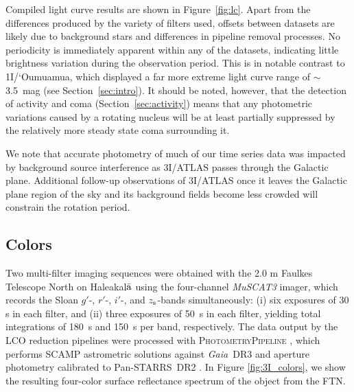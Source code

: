 \documentclass[twocolumn,longbib]{aastex7}
\begin{document}
\begin{CJK*}{UTF8}{gbsn}
Compiled light curve results are shown in Figure~\ref{fig:lc}.
Apart from the differences produced by the variety of filters used, offsets between datasets are likely due to background stars and differences in pipeline removal processes. No periodicity is immediately apparent within any of the datasets, indicating little brightness variation during the observation period.
This is in notable contrast to 1I/`Oumuamua, which displayed a far more extreme light curve range of $\sim$3.5~mag (see Section~\ref{sec:intro}). It should be noted, however, that the detection of activity and coma (Section~\ref{sec:activity}) means that any photometric variations caused by a rotating nucleus will be at least partially suppressed by the relatively more steady state coma surrounding it. %

We note that accurate photometry of much of our time series data was impacted by background source interference as 3I/ATLAS passes through the Galactic plane.
Additional follow-up observations of 3I/ATLAS once it leaves the Galactic plane region of the sky and its background fields become less crowded will constrain the rotation period. %



\subsection{Colors}\label{sec:colors}

Two multi-filter imaging sequences were obtained with the 2.0 m Faulkes Telescope North on Haleakal${\rm\bar{a}}$ using the four-channel \emph{MuSCAT3} imager, which records the Sloan $g'$-, $r'$-, $i'$-, and $z_{\rm s}$-bands simultaneously: (i) six exposures of 30 s in each filter, and (ii) three exposures of 50~s in each filter, yielding total integrations of 180~s and 150~s per band, respectively. The data output by the LCO reduction pipelines were processed with \textsc{PhotometryPipeline} \citep{Mommert_2017}, which performs SCAMP astrometric solutions against \textit{Gaia}~DR3 \citep{gaiacollaboration2023_gaiadr3} and aperture photometry calibrated to Pan-STARRS~DR2 \citep{flewelling2020_ps1}.
In Figure \ref{fig:3I_colors}, we show the resulting four-color surface reflectance spectrum of the object from the FTN.



\end{CJK*}
\end{document}
